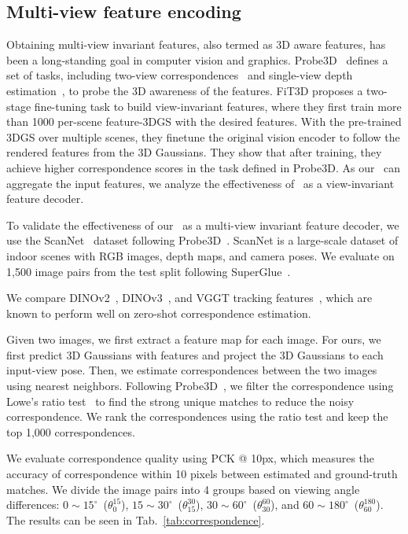 \subsection{Multi-view feature encoding}
Obtaining multi-view invariant features, also termed as 3D aware features, has been a long-standing goal in computer vision and graphics. Probe3D~\cite{el2024probing} defines a set of tasks, including two-view correspondences~\cite{hong2021deep,hong2022cost,cho2021cats,cho2022cats++,hong2024unifying2,hong2022neural} and single-view depth estimation~\cite{piccinelli2024unidepth}, to probe the 3D awareness of the features. FiT3D proposes a two-stage fine-tuning task to build view-invariant features, where they first train more than 1000 per-scene feature-3DGS with the desired features. With the pre-trained 3DGS over multiple scenes, they finetune the original vision encoder to follow the rendered features from the 3D Gaussians. They show that after training, they achieve higher correspondence scores in the task defined in Probe3D. As our \oursF\ can aggregate the input features, we analyze the effectiveness of \oursF\ as a view-invariant feature decoder.

To validate the effectiveness of our \oursF\ as a multi-view invariant feature decoder, we use the ScanNet~\cite{dai2017scannet} dataset following Probe3D~\cite{el2024probing}. ScanNet is a large-scale dataset of indoor scenes with RGB images, depth maps, and camera poses. We evaluate on 1,500 image pairs from the test split following SuperGlue~\cite{sarlin2020superglue}.

We compare DINOv2~\cite{oquab2023dinov2}, DINOv3~\cite{simeoni2025dinov3}, and VGGT tracking features~\cite{wang2025vggt}, which are known to perform well on zero-shot correspondence estimation.

Given two images, we first extract a feature map for each image. For ours, we first predict 3D Gaussians with features and project the 3D Gaussians to each input-view pose. Then, we estimate correspondences between the two images using nearest neighbors. Following Probe3D~\cite{el2024probing}, we filter the correspondence using Lowe's ratio test~\cite{lowe2004distinctive} to find the strong unique matches to reduce the noisy correspondence. We rank the correspondences using the ratio test and keep the top 1,000 correspondences. 

We evaluate correspondence quality using PCK @ 10px, which measures the accuracy of correspondence within 10 pixels between estimated and ground-truth matches. We divide the image pairs into 4 groups based on viewing angle differences: $0{\sim}15^\circ$~($\theta_0^{15}$), $15{\sim}30^\circ$~($\theta_{15}^{30}$), $30{\sim}60^\circ$~($\theta_{30}^{60}$), and $60{\sim}180^\circ$~($\theta_{60}^{180}$). The results can be seen in Tab.~\ref{tab:correspondence}.


